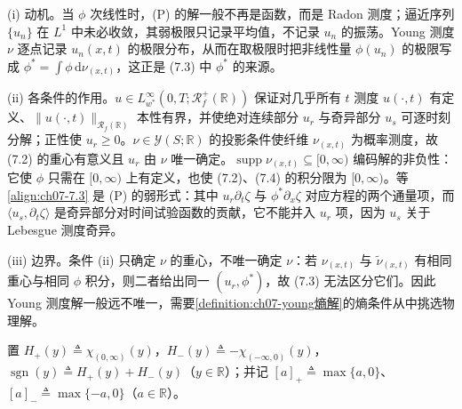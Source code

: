 ﻿\documentclass[../../main.tex]{subfiles}%
\begin{document}
\begin{remark}\label{remark:ch07-young测度解动机}
(i) 动机。当 $\phi$ 次线性时，(P) 的解一般不再是函数，而是 Radon 测度；逼近序列 $\{u_n\}$ 在 $L^1$ 中未必收敛，其弱极限只记录平均值，不记录 $u_n$ 的振荡。Young 测度 $\nu$ 逐点记录 $u_n(x,t)$ 的极限分布，从而在取极限时把非线性量 $\phi(u_n)$ 的极限写成 $\phi^*=\int\phi\,\mathrm{d}\nu_{(x,t)}$，这正是 (7.3) 中 $\phi^*$ 的来源。

(ii) 各条件的作用。$u\in L^\infty_{w^*}(0,T;\mathscr{R}_f^+(\mathbb{R}))$ 保证对几乎所有 $t$ 测度 $u(\cdot,t)$ 有定义、$\|u(\cdot,t)\|_{\mathscr{R}_f(\mathbb{R})}$ 本性有界，并使绝对连续部分 $u_r$ 与奇异部分 $u_s$ 可逐时刻分解；正性使 $u_r\geqslant0$。$\nu\in\mathcal{Y}(S;\mathbb{R})$ 的投影条件使纤维 $\nu_{(x,t)}$ 为概率测度，故 (7.2) 的重心有意义且 $u_r$ 由 $\nu$ 唯一确定。$\operatorname{supp}\nu_{(x,t)}\subseteq[0,\infty)$ 编码解的非负性：它使 $\phi$ 只需在 $[0,\infty)$ 上有定义，也使 (7.2)、(7.4) 的积分限为 $[0,\infty)$。等\eqref{align:ch07-7.3} 是 (P) 的弱形式：其中 $u_r\partial_t\zeta$ 与 $\phi^*\partial_x\zeta$ 对应方程的两个通量项，而 $\langle u_s,\partial_t\zeta\rangle$ 是奇异部分对时间试验函数的贡献，它不能并入 $u_r$ 项，因为 $u_s$ 关于 Lebesgue 测度奇异。

(iii) 边界。条件 (ii) 只确定 $\nu$ 的重心，不唯一确定 $\nu$：若 $\nu_{(x,t)}$ 与 $\tilde\nu_{(x,t)}$ 有相同重心与相同 $\phi$ 积分，则二者给出同一 $(u_r,\phi^*)$，故 (7.3) 无法区分它们。因此 Young 测度解一般远不唯一，需要\cref{definition:ch07-young熵解}的熵条件从中挑选物理解。
\end{remark}

置 $H_+(y)\triangleq\chi_{(0,\infty)}(y)$，$H_-(y)\triangleq-\chi_{(-\infty,0)}(y)$，$\operatorname{sgn}(y)\triangleq H_+(y)+H_-(y)$（$y\in\mathbb{R}$）；并记 $[a]_+\triangleq\max\{a,0\}$、$[a]_-\triangleq\max\{-a,0\}$（$a\in\mathbb{R}$）。
\end{document}

